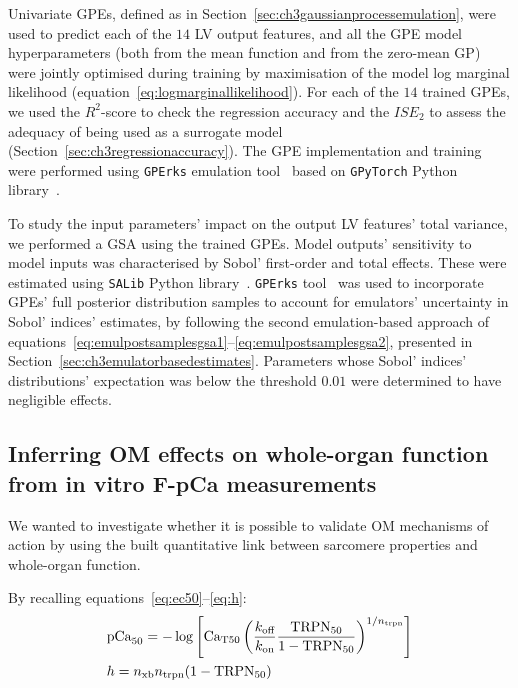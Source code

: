 \vspace{0.2cm}
Univariate GPEs, defined as in Section~\ref{sec:ch3gaussianprocessemulation}, were used to predict each of the $14$ LV output features, and all the GPE model hyperparameters (both from the mean function and from the zero-mean GP) were jointly optimised during training by maximisation of the model log marginal likelihood (equation~\eqref{eq:logmarginallikelihood}). For each of the $14$ trained GPEs, we used the $R^2$-score to check the regression accuracy and the $ISE_2$ to assess the adequacy of being used as a surrogate model (Section~\ref{sec:ch3regressionaccuracy}). The GPE implementation and training were performed using \texttt{GPErks} emulation tool~\cite{GPErks:2021} based on \texttt{GPyTorch} Python library~\cite{Gardner:2019}.

\vspace{0.2cm}
To study the input parameters' impact on the output LV features' total variance, we performed a GSA using the trained GPEs. Model outputs' sensitivity to model inputs was characterised by Sobol' first-order and total effects. These were estimated using \texttt{SALib} Python library~\cite{Herman:2017}. \texttt{GPErks} tool~\cite{GPErks:2021} was used to incorporate GPEs' full posterior distribution samples to account for emulators' uncertainty in Sobol' indices' estimates, by following the second emulation-based approach of equations~\eqref{eq:emulpostsamplesgsa1}--\eqref{eq:emulpostsamplesgsa2}, presented in Section~\ref{sec:ch3emulatorbasedestimates}. Parameters whose Sobol' indices' distributions' expectation was below the threshold $0.01$ were determined to have negligible effects.


%
%
%
\subsection{Inferring OM effects on whole-organ function from in vitro F-pCa measurements}\label{sec:ch5inferringomeffectswholeorganfpca}
We wanted to investigate whether it is possible to validate OM mechanisms of action by using the built quantitative link between sarcomere properties and whole-organ function.

\vspace{0.2cm}
By recalling equations~\eqref{eq:ec50}--\eqref{eq:h}:
%
\begin{align}
    & \textrm{pCa}_{50} = -\log\left[\textrm{Ca}_{\textrm{T}50}\left(\frac{k_{\textrm{off}}}{k_{\textrm{on}}}\frac{\textrm{TRPN}_{50}}{1-\textrm{TRPN}_{50}}\right)^{1/n_{\textrm{trpn}}}\right] \\
    & h = n_{\textrm{xb}}n_{\textrm{trpn}}(1-\textrm{TRPN}_{50})
\end{align}

